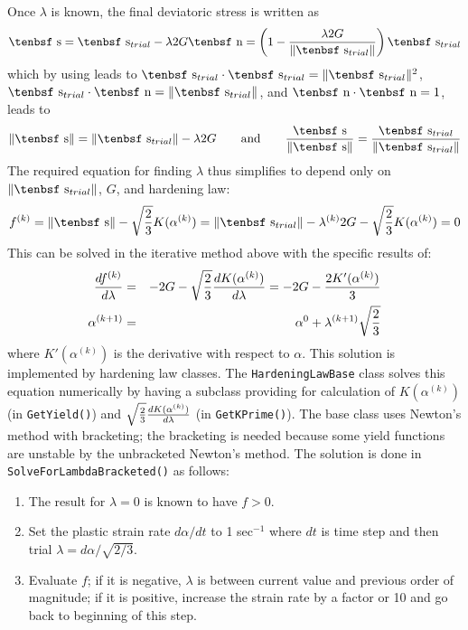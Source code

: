 \documentclass[11pt]{book}
\def\dev{\hbox{\tenbsf s}}
\def\ndev{\hbox{\tenbsf n}}
\def\code#1{{\small\tt #1}}
\begin{document}
Once $\lambda$ is known, the final deviatoric stress is written as
\begin{equation}
        \dev = \dev_{trial} - \lambda 2G\ndev = \left(1- {\lambda 2G\over \|\dev_{trial}\|}\right) \dev_{trial}
\end{equation}
which by using leads to $\dev_{trial}\cdot\dev_{trial} =  \|\dev_{trial}\|^2$, $\dev_{trial}\cdot\ndev =  \|\dev_{trial}\|$, and $\ndev\cdot\ndev=1$, leads to
\begin{equation}
         \|\dev\| =  \|\dev_{trial}\| - \lambda 2G \qquad {\rm and} \qquad 
         {\dev\over \|\dev\|} = {\dev_{trial}\over \|\dev_{trial}\|}
\end{equation}
The required equation for finding $\lambda$ thus simplifies to depend only on $\|\dev_{trial}\|$, $G$, and hardening law:
\begin{equation}
      f^{(k)} = \|\dev\| -  \sqrt{2\over3} K(\alpha^{(k)}) = \|\dev_{trial}\| - \lambda^{(k)} 2G -  \sqrt{2\over3} K(\alpha^{(k)}) = 0
\end{equation}
This can be solved in the iterative method above with the specific results of:
\begin{eqnarray}
        {df^{(k)}\over d\lambda} & = & -2G - \sqrt{2\over3}{dK(\alpha^{(k)})\over d\lambda}  = -2G - {2K'(\alpha^{(k)})\over 3} \\
        \alpha^{(k+1)} & = & \alpha^{0} +  \lambda^{(k+1)} \sqrt{2\over3}
\end{eqnarray}
where $K'(\alpha^{(k)})$ is the derivative with respect to $\alpha$. This solution is implemented by hardening law classes. The {\tt HardeningLawBase} class solves this equation numerically by having a subclass providing for calculation of $K(\alpha^{(k)})$ (in \code{GetYield()}) and $\sqrt{2\over3}{dK(\alpha^{(k)})\over d\lambda}$ (in \code{GetKPrime()}). The base class uses Newton's method with bracketing; the bracketing is needed because some yield functions are unstable by the unbracketed Newton's method. The solution is done in {\tt SolveForLambdaBracketed()} as follows:

\begin{enumerate}

\item The result for $\lambda=0$ is known to have $f>0$.

\item Set the plastic strain rate $d\alpha/dt$ to 1 sec$^{-1}$ where $dt$ is time step and then trial $\lambda=d\alpha/\sqrt{2/3}$.

\item Evaluate $f$; if it is negative, $\lambda$ is between current value and previous order of magnitude; if it is positive, increase the strain rate by a factor or 10 and go back to beginning of this step.

\end{enumerate}
\end{document}
